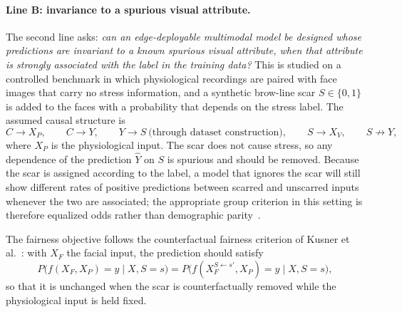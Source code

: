\paragraph{Line B: invariance to a spurious visual attribute.} The second line asks: \emph{can an edge-deployable multimodal model be designed whose predictions are invariant to a known spurious visual attribute, when that attribute is strongly associated with the label in the training data?} This is studied on a controlled benchmark in which physiological recordings are paired with face images that carry no stress information, and a synthetic brow-line scar $S \in \{0,1\}$ is added to the faces with a probability that depends on the stress label. The assumed causal structure is
\begin{equation}
C \to X_P, \qquad C \to Y, \qquad Y \to S \ \text{(through dataset construction)}, \qquad S \to X_V, \qquad S \not\to Y,
\end{equation}
where $X_P$ is the physiological input. The scar does not cause stress, so any dependence of the prediction $\hat{Y}$ on $S$ is spurious and should be removed. Because the scar is assigned according to the label, a model that ignores the scar will still show different rates of positive predictions between scarred and unscarred inputs whenever the two are associated; the appropriate group criterion in this setting is therefore equalized odds rather than demographic parity~\cite{anthis2023}.

The fairness objective follows the counterfactual fairness criterion of Kusner et al.~\cite{kusner2017}: with $X_F$ the facial input, the prediction should satisfy
\begin{equation}
P\bigl(f(X_F, X_P) = y \mid X, S = s\bigr) = P\bigl(f(X_F^{S \leftarrow s'}, X_P) = y \mid X, S = s\bigr),
\end{equation}
so that it is unchanged when the scar is counterfactually removed while the physiological input is held fixed.

